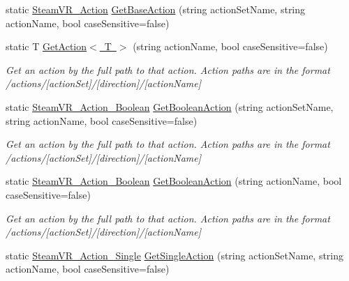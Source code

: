 \begin{DoxyCompactItemize}
static \mbox{\hyperlink{class_valve_1_1_v_r_1_1_steam_v_r___action}{Steam\+V\+R\+\_\+\+Action}} \mbox{\hyperlink{class_valve_1_1_v_r_1_1_steam_v_r___input_a635ec3bc7211d524ccd9bf463b5346e3}{Get\+Base\+Action}} (string action\+Set\+Name, string action\+Name, bool case\+Sensitive=false)
\item 
static T \mbox{\hyperlink{class_valve_1_1_v_r_1_1_steam_v_r___input_a3e5281b6293539de5de4ba4de967d72b}{Get\+Action$<$ T $>$}} (string action\+Name, bool case\+Sensitive=false)
\begin{DoxyCompactList}\small\item\em Get an action by the full path to that action. Action paths are in the format /actions/\mbox{[}action\+Set\mbox{]}/\mbox{[}direction\mbox{]}/\mbox{[}action\+Name\mbox{]} \end{DoxyCompactList}\item 
static \mbox{\hyperlink{class_valve_1_1_v_r_1_1_steam_v_r___action___boolean}{Steam\+V\+R\+\_\+\+Action\+\_\+\+Boolean}} \mbox{\hyperlink{class_valve_1_1_v_r_1_1_steam_v_r___input_a1442b5592282c75d7caeb91fe3509124}{Get\+Boolean\+Action}} (string action\+Set\+Name, string action\+Name, bool case\+Sensitive=false)
\begin{DoxyCompactList}\small\item\em Get an action by the full path to that action. Action paths are in the format /actions/\mbox{[}action\+Set\mbox{]}/\mbox{[}direction\mbox{]}/\mbox{[}action\+Name\mbox{]} \end{DoxyCompactList}\item 
static \mbox{\hyperlink{class_valve_1_1_v_r_1_1_steam_v_r___action___boolean}{Steam\+V\+R\+\_\+\+Action\+\_\+\+Boolean}} \mbox{\hyperlink{class_valve_1_1_v_r_1_1_steam_v_r___input_ad899a1104e3be4772cae55c0eb6e350e}{Get\+Boolean\+Action}} (string action\+Name, bool case\+Sensitive=false)
\begin{DoxyCompactList}\small\item\em Get an action by the full path to that action. Action paths are in the format /actions/\mbox{[}action\+Set\mbox{]}/\mbox{[}direction\mbox{]}/\mbox{[}action\+Name\mbox{]} \end{DoxyCompactList}\item 
static \mbox{\hyperlink{class_valve_1_1_v_r_1_1_steam_v_r___action___single}{Steam\+V\+R\+\_\+\+Action\+\_\+\+Single}} \mbox{\hyperlink{class_valve_1_1_v_r_1_1_steam_v_r___input_a9880b4d24247606b61c26c5efcd2e803}{Get\+Single\+Action}} (string action\+Set\+Name, string action\+Name, bool case\+Sensitive=false)

\end{DoxyCompactItemize}
